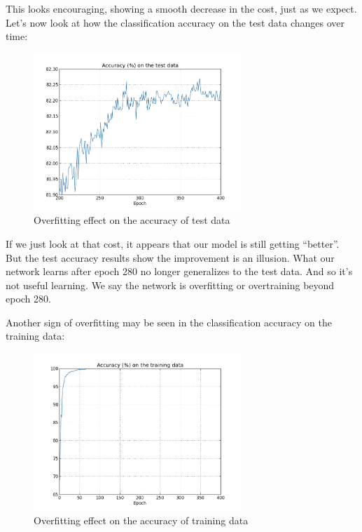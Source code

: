 \documentclass[12 pt]{article}
\begin{document}
This looks encouraging, showing a smooth decrease in the cost, just as
we expect. Let's now look at how the classification accuracy on the test
data changes over time:

\begin{figure}[htp]
\centering
\includegraphics[width=0.7\textwidth]{./figs/overfitting2.png}
\caption{Overfitting effect on the accuracy of test data}
\end{figure}

If we just look at that cost, it appears that our model is still getting
``better''. But the test accuracy results show the improvement is an
illusion. What our network learns after epoch 280 no longer generalizes
to the test data. And so it's not useful learning. We say the network is
overfitting or overtraining beyond epoch 280.

Another sign of overfitting may be seen in the classification accuracy
on the training data:

\begin{figure}[htp]
\centering
\includegraphics[width=0.7\textwidth]{./figs/overfitting4.png}
\caption{Overfitting effect on the accuracy of training data}
\end{figure}
\end{document}
